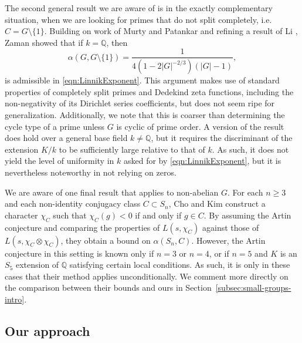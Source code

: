 \documentclass[12pt]{amsart}
\theoremstyle{definition} \newtheorem{definition}[theorem]{Definition}
\theoremstyle{example} \newtheorem{example}[theorem]{Example}
\theoremstyle{remark} \newtheorem{remark}{Remark}[theorem]
\numberwithin{equation}{section}
\numberwithin{theorem}{section}
\renewcommand{\geq}{\geqslant}
\begin{document}
	The second general result we are aware of is in the exactly complementary situation, when we are looking for primes that do not split completely, i.e. $C = G \setminus \{1\}$.  Building on work of Murty and Patankar \cite{MurtyPatankar-Tate} and refining a result of Li \cite{Li-NonSplit}, Zaman \cite{Zaman-NonSplit} showed that if $k=\mathbb{Q}$, then
	\begin{equation} \label{eqn:LinnikExponent-Zaman}
		\alpha(G, G \setminus \{1\} ) = \frac{1}{4(1-2|G|^{-2/3})(|G|-1)},
	\end{equation}
	is admissible in \eqref{eqn:LinnikExponent}.  
	This argument makes use of standard properties of completely split primes and Dedekind zeta functions, including  the non-negativity of its Dirichlet series coefficients, but does not seem ripe for generalization.  Additionally, we note that this is coarser than determining the cycle type of a prime unless $G$ is cyclic of prime order.  A version of the result does hold over a general base field $k \ne \mathbb{Q}$, but it requires the discriminant of the extension $K/k$ to be sufficiently large relative to that of $k$.  As such, it does not yield the level of uniformity in $k$ asked for by \eqref{eqn:LinnikExponent}, but it is nevertheless noteworthy in not relying on zeros.
	
	We are aware of one final result that applies to non-abelian $G$.  For each $n \geq 3$ and each non-identity conjugacy class $C \subset S_n$, Cho and Kim \cite{ChoKim-SignChange} construct a character $\chi_C$ such that $\chi_C(g) < 0$ if and only if $g \in C$.  By assuming the Artin conjecture and comparing the properties of $L(s,\chi_C)$ against those of $L(s,\chi_C \otimes \chi_C)$, they obtain a bound on $\alpha(S_n,C)$.  However, the Artin conjecture in this setting is known only if $n=3$ or $n=4$, or if $n=5$ and $K$ is an $S_5$ extension of $\mathbb{Q}$ satisfying certain local conditions.  As such, it is only in these cases that their method applies unconditionally.  We comment more directly on the comparison between their bounds and ours in Section~\ref{subsec:small-groups-intro}.
	
	

	
\subsection{Our approach}
	\label{subsec:approach}
\end{document}
